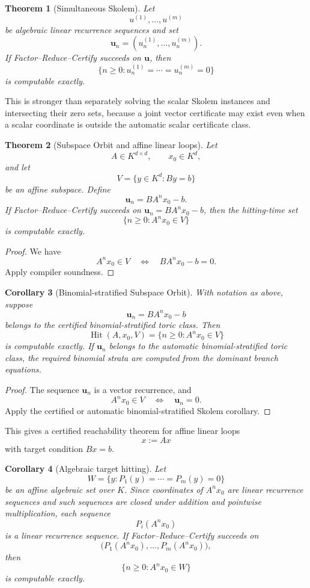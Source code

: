\documentclass[11pt]{article}
\newtheorem{theorem}{Theorem}[section]
\newtheorem{corollary}[theorem]{Corollary}
\DeclareMathOperator{\Hit}{Hit}
\begin{document}
\begin{theorem}[Simultaneous Skolem]
Let
\[
u^{(1)},\ldots,u^{(m)}
\]
be algebraic linear recurrence sequences and set
\[
\mathbf u_n=(u^{(1)}_n,\ldots,u^{(m)}_n).
\]
If Factor--Reduce--Certify succeeds on \(\mathbf u\), then
\[
\{n\ge0:u^{(1)}_n=\cdots=u^{(m)}_n=0\}
\]
is computable exactly.
\end{theorem}

This is stronger than separately solving the scalar Skolem instances and intersecting their zero sets, because a joint vector certificate may exist even when a scalar coordinate is outside the automatic scalar certificate class.

\begin{theorem}[Subspace Orbit and affine linear loops]
Let
\[
A\in K^{d\times d},
\qquad
x_0\in K^d,
\]
and let
\[
V=\{y\in K^d:By=b\}
\]
be an affine subspace. Define
\[
\mathbf u_n=BA^nx_0-b.
\]
If Factor--Reduce--Certify succeeds on \(\mathbf u_n=BA^nx_0-b\), then the hitting-time set
\[
\{n\ge0:A^nx_0\in V\}
\]
is computable exactly.
\end{theorem}

\begin{proof}
We have
\[
A^nx_0\in V
\quad\Longleftrightarrow\quad
BA^nx_0-b=0.
\]
Apply compiler soundness.
\end{proof}

\begin{corollary}[Binomial-stratified Subspace Orbit]
With notation as above, suppose
\[
\mathbf u_n=BA^nx_0-b
\]
belongs to the certified binomial-stratified toric class. Then
\[
\Hit(A,x_0,V)=\{n\ge0:A^nx_0\in V\}
\]
is computable exactly. If \(\mathbf u_n\) belongs to the automatic binomial-stratified toric class, the required binomial strata are computed from the dominant branch equations.
\end{corollary}

\begin{proof}
The sequence \(\mathbf u_n\) is a vector recurrence, and
\[
A^nx_0\in V
\quad\Longleftrightarrow\quad
\mathbf u_n=0.
\]
Apply the certified or automatic binomial-stratified Skolem corollary.
\end{proof}

This gives a certified reachability theorem for affine linear loops
\[
x:=Ax
\]
with target condition \(Bx=b\).

\begin{corollary}[Algebraic target hitting]
Let
\[
W=\{y:P_1(y)=\cdots=P_m(y)=0\}
\]
be an affine algebraic set over \(K\). Since coordinates of \(A^nx_0\) are linear recurrence sequences and such sequences are closed under addition and pointwise multiplication, each sequence
\[
P_i(A^nx_0)
\]
is a linear recurrence sequence. If Factor--Reduce--Certify succeeds on
\[
\bigl(P_1(A^nx_0),\ldots,P_m(A^nx_0)\bigr),
\]
then
\[
\{n\ge0:A^nx_0\in W\}
\]
is computable exactly.
\end{corollary}
\end{document}
